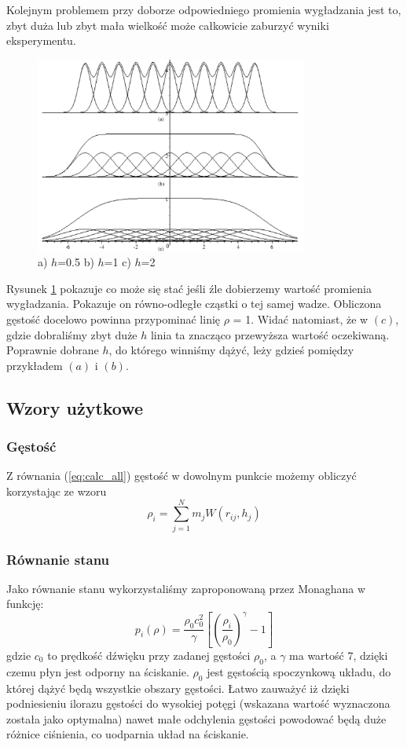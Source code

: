 \documentclass[polish, 12pt]{aghthesis}
\begin{document}
			Kolejnym problemem przy doborze odpowiedniego promienia wygładzania jest to, zbyt duża lub zbyt mała wielkość może całkowicie zaburzyć wyniki eksperymentu.
			\begin{figure}[h!]
			\centering
			\includegraphics[width=0.8\textwidth]{smoothing.png}
			\caption{a) $h$=0.5 b) $h$=1 c) $h$=2}
			\label{fig:smoothing}
			\end{figure}
			Rysunek \ref{fig:smoothing} pokazuje co może się stać jeśli źle dobierzemy wartość promienia wygładzania. Pokazuje on równo-odległe cząstki o tej samej wadze. Obliczona gęstość docelowo powinna przypominać linię ${\rho}$ = 1. Widać natomiast, że w $(c)$, gdzie dobraliśmy zbyt duże $h$ linia ta znacząco przewyższa wartość oczekiwaną. Poprawnie dobrane $h$, do którego winniśmy dążyć, leży gdzieś pomiędzy przykładem $(a)$ i $(b)$.
			
		\subsection{Wzory użytkowe}
			\subsubsection{Gęstość}
			Z równania (\ref{eq:calc_all}) gęstość w dowolnym punkcie możemy obliczyć korzystając ze wzoru \[{\rho}_i=\sum_{j=1}^{N}m_jW(r_{ij},h_j) \label{eq:calc_density} \tag{8}\] 
			\subsubsection{Równanie stanu}
			Jako równanie stanu wykorzystaliśmy zaproponowaną przez Monaghana w \cite{Monaghan} funkcję:
			\[p_i(\rho)=\frac{\rho_0 c_0^2}{\gamma}[(\frac{\rho_i}{\rho_0})^{\gamma} - 1] \label{eq:calc_state} \tag{8}\]
			gdzie ${c_0}$ to prędkość dźwięku przy zadanej gęstości ${\rho_0}$, a ${\gamma}$ ma wartość 7, dzięki czemu płyn jest odporny na ściskanie. $\rho_0$ jest gęstością spoczynkową układu, do której dążyć będą wszystkie obszary gęstości. Łatwo zauważyć iż dzięki podniesieniu ilorazu gęstości do wysokiej potęgi (wskazana wartość wyznaczona została jako optymalna) nawet małe odchylenia gęstości powodować będą duże różnice ciśnienia, co uodparnia układ na ściskanie.
			
\end{document}
